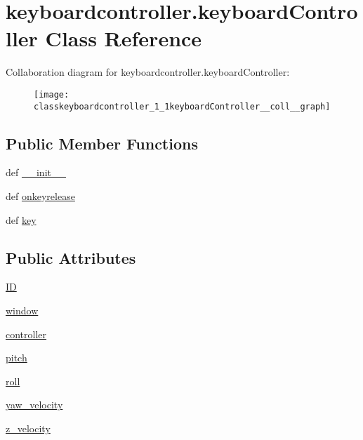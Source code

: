 \hypertarget{classkeyboardcontroller_1_1keyboardController}{\section{keyboardcontroller.\-keyboard\-Controller Class Reference}
\label{classkeyboardcontroller_1_1keyboardController}
}


Collaboration diagram for keyboardcontroller.\-keyboard\-Controller\-:
\nopagebreak
\begin{figure}[H]
\begin{center}
\leavevmode
\texttt{[image: classkeyboardcontroller\_1\_1keyboardController\_\_coll\_\_graph]}
\end{center}
\end{figure}
\subsection*{Public Member Functions}
\begin{DoxyCompactItemize}
\item 
def \hyperlink{classkeyboardcontroller_1_1keyboardController_a323ec514c66b7da1fc0856bd46b708bd}{\-\_\-\-\_\-init\-\_\-\-\_\-}
\item 
def \hyperlink{classkeyboardcontroller_1_1keyboardController_a2e42ab2b8188d3cd50d546abb31626b8}{onkeyrelease}
\item 
def \hyperlink{classkeyboardcontroller_1_1keyboardController_a161f29ac7567aa737ab8ed74849d4904}{key}
\end{DoxyCompactItemize}
\subsection*{Public Attributes}
\begin{DoxyCompactItemize}
\item 
\hyperlink{classkeyboardcontroller_1_1keyboardController_a8668e027600858b08be3135edc5f334a}{I\-D}
\item 
\hyperlink{classkeyboardcontroller_1_1keyboardController_af25e2b2c9415f5c1ea0aa8bba1a820e3}{window}
\item 
\hyperlink{classkeyboardcontroller_1_1keyboardController_acedfc069a10168dd3e8de172dcc4f817}{controller}
\item 
\hyperlink{classkeyboardcontroller_1_1keyboardController_a14f579accd5ea6498e009e4b7968956e}{pitch}
\item 
\hyperlink{classkeyboardcontroller_1_1keyboardController_a4a8d6c8beae909fb2c5fb61fc2ec5b24}{roll}
\item 
\hyperlink{classkeyboardcontroller_1_1keyboardController_ab663e9f8d311f682d374c4e401f7e34b}{yaw\-\_\-velocity}
\item 
\hyperlink{classkeyboardcontroller_1_1keyboardController_a7872c41368e57d177dd6f4660b1447af}{z\-\_\-velocity}
\end{DoxyCompactItemize}
